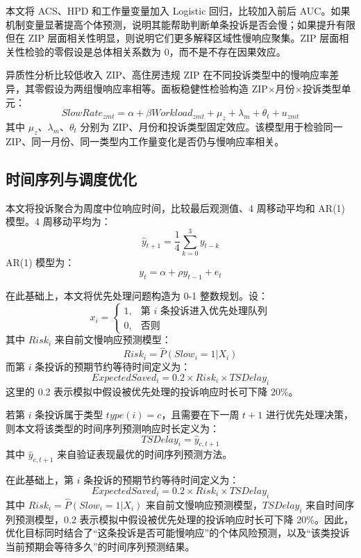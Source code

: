 \documentclass[UTF8,a4paper,12pt]{ctexart}
\begin{document}
本文将 ACS、HPD 和工作量变量加入 Logistic 回归，比较加入前后 AUC。如果机制变量显著提高个体预测，说明其能帮助判断单条投诉是否会慢；如果提升有限但在 ZIP 层面相关性明显，则说明它们更多解释区域性慢响应聚集。ZIP 层面相关性检验的零假设是总体相关系数为 0，而不是不存在因果效应。

异质性分析比较低收入 ZIP、高住房违规 ZIP 在不同投诉类型中的慢响应率差异，其零假设为两组慢响应率相等。面板稳健性检验构造 ZIP\(\times\)月份\(\times\)投诉类型单元：
\begin{equation}
SlowRate_{zmt}=\alpha+\beta Workload_{zmt}+\mu_z+\lambda_m+\theta_t+u_{zmt}
\end{equation}
其中 \(\mu_z\)、\(\lambda_m\)、\(\theta_t\) 分别为 ZIP、月份和投诉类型固定效应。该模型用于检验同一 ZIP、同一月份、同一类型内工作量变化是否仍与慢响应率相关。

\subsection{时间序列与调度优化}

本文将投诉聚合为周度中位响应时间，比较最后观测值、4 周移动平均和 AR(1) 模型。4 周移动平均为：
\begin{equation}
\hat y_{t+1}=\frac{1}{4}\sum_{k=0}^{3}y_{t-k}
\end{equation}
AR(1) 模型为：
\begin{equation}
y_t=\alpha+\rho y_{t-1}+e_t
\end{equation}


在此基础上，本文将优先处理问题构造为 0-1 整数规划。设：
\[
x_i=
\begin{cases}
1, & \text{第 } i \text{ 条投诉进入优先处理队列}\\
0, & \text{否则}
\end{cases}
\]
其中 \(Risk_i\) 来自前文慢响应预测模型：
\[
Risk_i=\hat P(Slow_i=1|X_i)
\]
而第 \(i\) 条投诉的预期节约等待时间定义为：
\[
ExpectedSaved_i=0.2\times Risk_i\times TSDelay_i
\]
这里的 0.2 表示模拟中假设被优先处理的投诉响应时长可下降 20\%。


若第 \(i\) 条投诉属于类型 \(type(i)=c\)，且需要在下一周 \(t+1\) 进行优先处理决策，则本文将该类型的时间序列预测响应时长定义为：
\begin{equation}
TSDelay_i=\hat y_{c,t+1}
\end{equation}
其中 \(\hat y_{c,t+1}\) 来自验证表现最优的时间序列预测方法。

在此基础上，第 \(i\) 条投诉的预期节约等待时间定义为：
\begin{equation}
ExpectedSaved_i
=
0.2\times Risk_i\times TSDelay_i
\end{equation}
其中 \(Risk_i=\hat P(Slow_i=1|X_i)\) 来自前文慢响应预测模型，\(TSDelay_i\) 来自时间序列预测模型，0.2 表示模拟中假设被优先处理的投诉响应时长可下降 20\%。因此，优化目标同时结合了“这条投诉是否可能慢响应”的个体风险预测，以及“该类投诉当前预期会等待多久”的时间序列预测结果。
\end{document}
